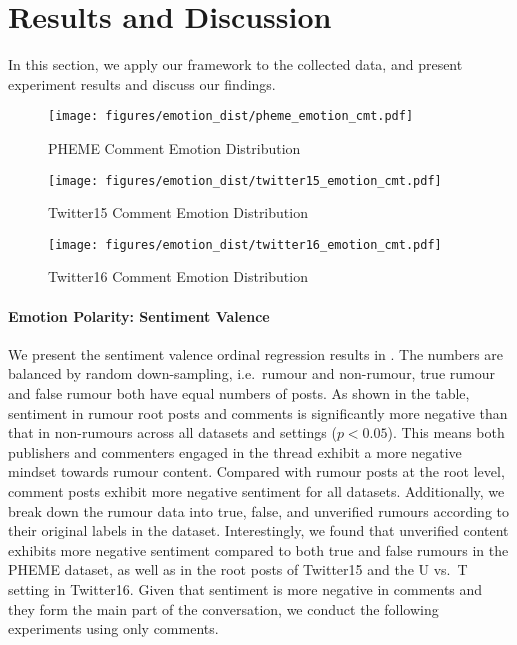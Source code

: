 \section{Results and Discussion}
In this section, we apply our framework to the collected data, and present experiment results and discuss our findings.

\begin{figure}[t!]
    \centering
    \texttt{[image: figures/emotion\_dist/pheme\_emotion\_cmt.pdf]}
    \caption{PHEME Comment Emotion Distribution}
	\label{fig:pheme_emotion}
\end{figure}

\begin{figure}[t!]
    \centering
    \texttt{[image: figures/emotion\_dist/twitter15\_emotion\_cmt.pdf]}
    \caption{Twitter15 Comment Emotion Distribution}
	\label{fig:twitter15_emotion}
\end{figure}

\begin{figure}[t!]
    \centering
    \texttt{[image: figures/emotion\_dist/twitter16\_emotion\_cmt.pdf]}
    \caption{Twitter16 Comment Emotion Distribution}
	\label{fig:twitter16_emotion}
\end{figure}


\paragraph{Emotion Polarity: Sentiment Valence}
We present the sentiment valence ordinal regression results in . The numbers are balanced by random down-sampling, i.e.\ rumour and non-rumour, true rumour and false rumour both have equal numbers of posts. As shown in the table, sentiment in rumour root posts and comments is significantly more negative than that in non-rumours across all datasets and settings ($p<0.05$). This means both publishers and commenters engaged in the thread exhibit a more negative mindset towards rumour content. Compared with rumour posts at the root level, comment posts exhibit more negative sentiment for all datasets. Additionally, we break down the rumour data into true, false, and unverified rumours according to their original labels in the dataset. Interestingly, we found that unverified content exhibits more negative sentiment compared to both true and false rumours in the PHEME dataset, as well as in the root posts of Twitter15 and the U vs.\ T setting in Twitter16. Given that sentiment is more negative in comments and they form the main part of the conversation, we conduct the following experiments using only comments. 


